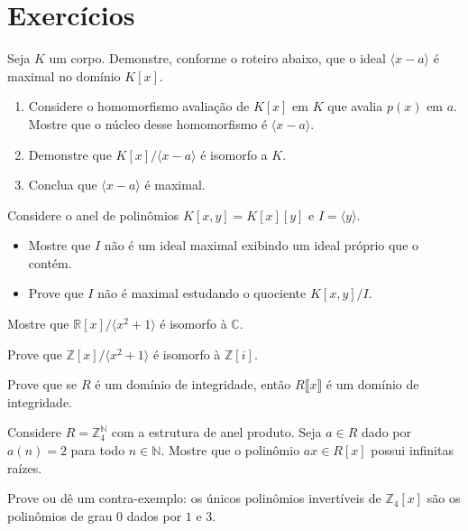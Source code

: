 \section{Exercícios}
\begin{exer}
    Seja $K$ um corpo. Demonstre, conforme o roteiro abaixo, que o ideal $\langle x-a\rangle$ é maximal no domínio $K[x]$.
    \begin{enumerate}[label=\alph*)]
        \item Considere o homomorfismo avaliação de $K[x]$ em $K$ que avalia $p(x)$ em $a$. Mostre que o núcleo desse homomorfismo é $\langle x-a\rangle$.
        \item Demonstre que $K[x]/\langle x-a\rangle$ é isomorfo a $K$.
        \item Conclua que $\langle x-a\rangle$ é maximal.
    \end{enumerate}
\end{exer}
\begin{exer}
    Considere o anel de polinômios $K[x, y]=K[x][y]$ e  $I=\langle y\rangle$.
    \begin{itemize}
        \item Mostre que $I$ não é um ideal maximal exibindo um ideal próprio que o contém.
        \item Prove que $I$ não é maximal estudando o quociente $K[x, y]/I$.
    \end{itemize}
\end{exer}
\begin{exer}
Mostre que $\mathbb R[x]/\langle x^2+1\rangle$ é isomorfo à $\mathbb C$.
\end{exer}
\begin{exer}
    Prove que $\mathbb Z[x]/\langle x^2+1\rangle$ é isomorfo à $\mathbb Z[i]$.
\end{exer}
\begin{exer}\label{exer:polinomio_serieDominio}
    Prove que se $R$ é um domínio de integridade, então $R\llbracket x \rrbracket$ é um domínio de integridade.
\end{exer}
\begin{exer}
Considere $R=\mathbb Z_4^\mathbb N$ com a estrutura de anel produto. Seja $a \in R$ dado por $a(n)=2$ para todo $n \in \mathbb N$. Mostre que o polinômio $ax \in R[x]$ possui infinitas raízes.
\end{exer}

\begin{exer}
    Prove ou dê um contra-exemplo: os únicos polinômios invertíveis de $\mathbb Z_4[x]$ são os polinômios de grau $0$ dados por $1$ e $3$.
\end{exer}

